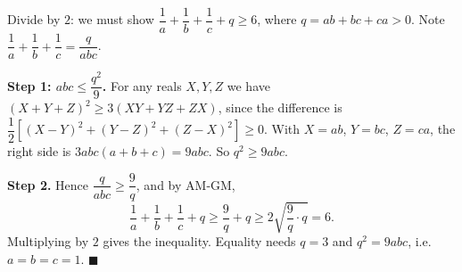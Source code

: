 Divide by $2$: we must show $\dfrac{1}{a}+\dfrac{1}{b}+\dfrac{1}{c}+q\ge6$, where $q=ab+bc+ca>0$. Note $\dfrac{1}{a}+\dfrac{1}{b}+\dfrac{1}{c}=\dfrac{q}{abc}$.

\textbf{Step 1: $abc\le\dfrac{q^2}{9}$.} For any reals $X,Y,Z$ we have $(X+Y+Z)^2\ge3(XY+YZ+ZX)$, since the difference is $\dfrac{1}{2}\left[(X-Y)^2+(Y-Z)^2+(Z-X)^2\right]\ge0$. With $X=ab$, $Y=bc$, $Z=ca$, the right side is $3abc(a+b+c)=9abc$. So $q^2\ge9abc$.

\textbf{Step 2.} Hence $\dfrac{q}{abc}\ge\dfrac{9}{q}$, and by AM-GM,
\[
\dfrac{1}{a}+\dfrac{1}{b}+\dfrac{1}{c}+q\ge\dfrac{9}{q}+q\ge2\sqrt{\dfrac{9}{q}\cdot q}=6 .
\]
Multiplying by $2$ gives the inequality. Equality needs $q=3$ and $q^2=9abc$, i.e.\ $a=b=c=1$. $\blacksquare$
